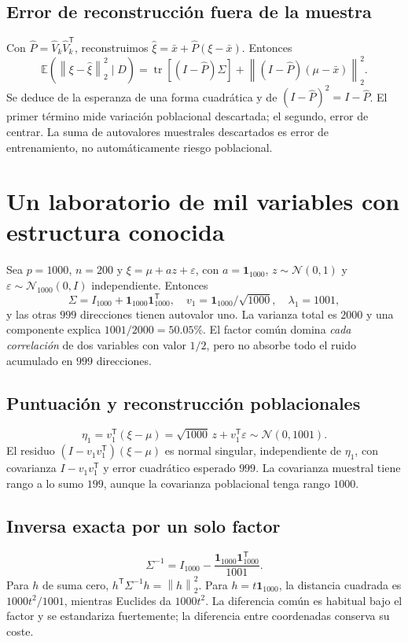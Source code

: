 \documentclass[11pt,a4paper]{article}
\newcommand{\E}{\mathbb E}
\newcommand{\T}{^{\mathsf T}}
\newcommand{\norm}[1]{\left\lVert #1\right\rVert}
\DeclareMathOperator{\tr}{tr}
\newcommand{\ones}{\mathbf 1}
\theoremstyle{definition}
\begin{document}
\subsection{Error de reconstrucción fuera de la muestra}
Con $\widehat P=\widehat V_k\widehat V_k\T$, reconstruimos $\widehat\xi=\bar x+\widehat P(\xi-\bar x)$. Entonces
\[
\E(\norm{\xi-\widehat\xi}_2^2\mid D)
=\tr[(I-\widehat P)\Sigma]+\norm{(I-\widehat P)(\mu-\bar x)}_2^2.
\]
Se deduce de la esperanza de una forma cuadrática y de $(I-\widehat P)^2=I-\widehat P$. El primer término mide variación poblacional descartada; el segundo, error de centrar. La suma de autovalores muestrales descartados es error de entrenamiento, no automáticamente riesgo poblacional.

\section{Un laboratorio de mil variables con estructura conocida}
Sea $p=1000$, $n=200$ y $\xi=\mu+az+\varepsilon$, con $a=\ones_{1000}$, $z\sim\mathcal N(0,1)$ y $\varepsilon\sim\mathcal N_{1000}(0,I)$ independiente. Entonces
\[
\Sigma=I_{1000}+\ones_{1000}\ones_{1000}\T,
\quad v_1=\ones_{1000}/\sqrt{1000},\quad\lambda_1=1001,
\]
y las otras $999$ direcciones tienen autovalor uno. La varianza total es $2000$ y una componente explica $1001/2000=50.05\%$. El factor común domina \emph{cada correlación} de dos variables con valor $1/2$, pero no absorbe todo el ruido acumulado en $999$ direcciones.
\subsection{Puntuación y reconstrucción poblacionales}
\[
\eta_1=v_1\T(\xi-\mu)=\sqrt{1000}\,z+v_1\T\varepsilon
\sim\mathcal N(0,1001).
\]
El residuo $(I-v_1v_1\T)(\xi-\mu)$ es normal singular, independiente de $\eta_1$, con covarianza $I-v_1v_1\T$ y error cuadrático esperado $999$. La covarianza muestral tiene rango a lo sumo $199$, aunque la covarianza poblacional tenga rango $1000$.
\subsection{Inversa exacta por un solo factor}
\[
\Sigma^{-1}=I_{1000}-\frac{\ones_{1000}\ones_{1000}\T}{1001}.
\]
Para $h$ de suma cero, $h\T\Sigma^{-1}h=\norm h_2^2$. Para $h=t\ones_{1000}$, la distancia cuadrada es $1000t^2/1001$, mientras Euclides da $1000t^2$. La diferencia común es habitual bajo el factor y se estandariza fuertemente; la diferencia entre coordenadas conserva su coste.
\end{document}
